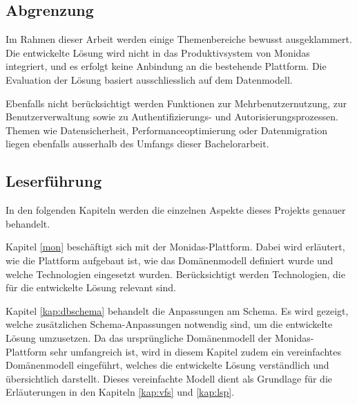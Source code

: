\subsection{Abgrenzung}


Im Rahmen dieser Arbeit werden einige Themenbereiche bewusst ausgeklammert. Die entwickelte Lösung wird nicht in das Produktivsystem von Monidas integriert, und es erfolgt keine Anbindung an die bestehende Plattform. Die Evaluation der Lösung basiert ausschliesslich auf dem Datenmodell.

Ebenfalls nicht berücksichtigt werden Funktionen zur Mehrbenutzernutzung, zur Benutzerverwaltung sowie zu Authentifizierungs- und Autorisierungsprozessen. Themen wie Datensicherheit, Performanceoptimierung oder Datenmigration liegen ebenfalls ausserhalb des Umfangs dieser Bachelorarbeit.

\subsection{Leserführung}
In den folgenden Kapiteln werden die einzelnen Aspekte dieses Projekts genauer behandelt.
 
Kapitel \ref{mon} beschäftigt sich mit der Monidas-Plattform. Dabei wird erläutert, wie die Plattform aufgebaut ist, wie das Domänenmodell definiert wurde und welche Technologien eingesetzt wurden. Berücksichtigt werden Technologien, die für die entwickelte Lösung relevant sind.

Kapitel \ref{kap:dbschema} behandelt die Anpassungen am Schema. Es wird gezeigt, welche zusätzlichen Schema-Anpassungen notwendig sind, um die entwickelte Lösung umzusetzen. Da das ursprüngliche Domänenmodell der Monidas-Plattform sehr umfangreich ist, wird in diesem Kapitel zudem ein vereinfachtes Domänenmodell eingeführt, welches die entwickelte Lösung verständlich und übersichtlich darstellt. Dieses vereinfachte Modell dient als Grundlage für die Erläuterungen in den Kapiteln \ref{kap:vfs} und \ref{kap:lsp}.

